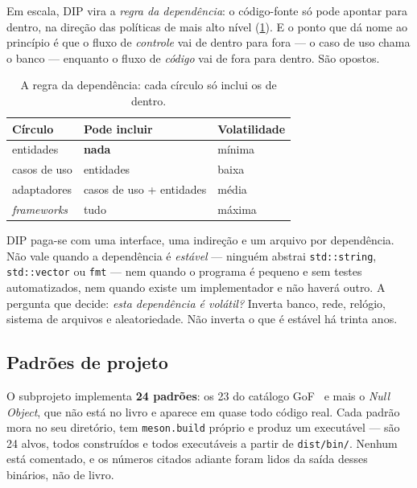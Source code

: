 Em escala, DIP vira a \emph{regra da dependência}: o código-fonte só pode
apontar para dentro, na direção das políticas de mais alto nível
(\cref{tab:camadas}). E o ponto que dá nome ao princípio é que o fluxo de
\emph{controle} vai de dentro para fora --- o caso de uso chama o banco ---
enquanto o fluxo de \emph{código} vai de fora para dentro. São opostos.

\begin{table}[htbp]
\centering
\caption{A regra da dependência: cada círculo só inclui os de dentro.}
\label{tab:camadas}
\footnotesize
\begin{tabular}{@{}lll@{}}
\toprule
\textbf{Círculo} & \textbf{Pode incluir} & \textbf{Volatilidade} \\
\midrule
entidades    & \textbf{nada}                & mínima \\
casos de uso & entidades                    & baixa \\
adaptadores  & casos de uso + entidades     & média \\
\emph{frameworks} & tudo                    & máxima \\
\bottomrule
\end{tabular}
\end{table}

\begin{regra}
DIP paga-se com uma interface, uma indireção e um arquivo por dependência. Não
vale quando a dependência é \emph{estável} --- ninguém abstrai
\texttt{std::string}, \texttt{std::vector} ou \texttt{fmt} --- nem quando o
programa é pequeno e sem testes automatizados, nem quando existe um
implementador e não haverá outro. A pergunta que decide: \emph{esta dependência
é volátil?} Inverta banco, rede, relógio, sistema de arquivos e aleatoriedade.
Não inverta o que é estável há trinta anos.
\end{regra}

\subsection{Padrões de projeto}
\label{sec:patterns}

O subprojeto  implementa \textbf{24 padrões}: os 23
do catálogo GoF~\cite{gof1994} e mais o \emph{Null Object}, que não está no
livro e aparece em quase todo código real. Cada padrão mora no seu diretório,
tem \texttt{meson.build} próprio e produz um executável --- são 24 alvos, todos
construídos e todos executáveis a partir de \texttt{dist/bin/}. Nenhum está
comentado, e os números citados adiante foram lidos da saída desses binários,
não de livro.

